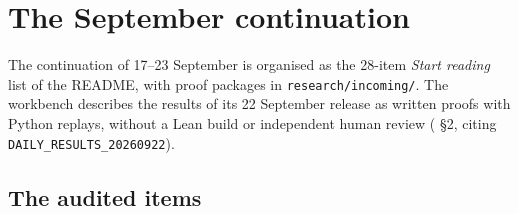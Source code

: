 \section{The September continuation}\label{sec:items}

The continuation of 17--23 September is organised as the 28-item \emph{Start reading} list of the README, with proof packages in \texttt{research/incoming/}. The workbench describes the results of its 22 September release as written proofs with Python replays, without a Lean build or independent human review ( §2, citing \texttt{DAILY\_RESULTS\_20260922}).

\subsection{The audited items}

